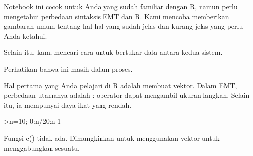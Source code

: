 \documentclass[a4paper,10pt]{article}
\begin{document}
\begin{eulernotebook}
\begin{eulercomment}
\begin{eulercomment}
\begin{eulercomment}
Notebook ini cocok untuk Anda yang sudah familiar dengan R, namun
perlu mengetahui perbedaan sintaksis EMT dan R. Kami mencoba
memberikan gambaran umum tentang hal-hal yang sudah jelas dan kurang
jelas yang perlu Anda ketahui.

Selain itu, kami mencari cara untuk bertukar data antara kedua sistem.
\end{eulercomment}
\begin{eulercomment}
Perhatikan bahwa ini masih dalam proses.
\end{eulercomment}
\begin{eulercomment}
Hal pertama yang Anda pelajari di R adalah membuat vektor. Dalam EMT,
perbedaan utamanya adalah : operator dapat mengambil ukuran langkah.
Selain itu, ia mempunyai daya ikat yang rendah.
\end{eulercomment}
\begin{eulerprompt}
>n=10; 0:n/20:n-1
\end{eulerprompt}
\begin{euleroutput}
  [0,  0.5,  1,  1.5,  2,  2.5,  3,  3.5,  4,  4.5,  5,  5.5,  6,  6.5,  7,  7.5,  8,  8.5,  9]
\end{euleroutput}
\begin{eulercomment}
Fungsi c() tidak ada. Dimungkinkan untuk menggunakan vektor untuk
menggabungkan sesuatu.


\end{eulercomment}
\end{eulercomment}
\end{eulercomment}
\end{eulernotebook}
\end{document}
